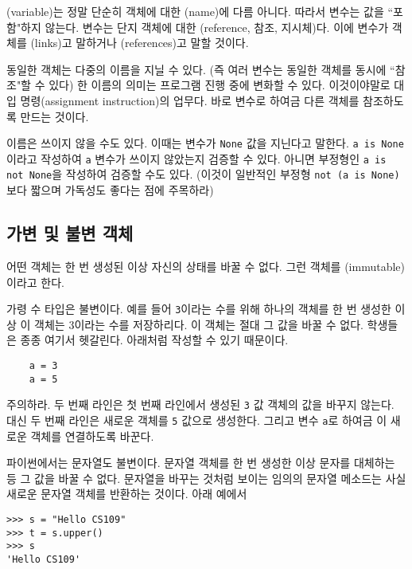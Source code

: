 \documentclass[a4paper]{oblivoir}
\begin{document}
(variable)는 정말 단순히 객체에 대한 (name)에 다름 아니다. 따라서 변수는 값을 ``포함"하지 않는다. 변수는 단지 객체에 대한 (reference, 참조, 지시체)다. 이에 변수가 객체를 (links)고 말하거나 (references)고 말할 것이다.  

동일한 객체는 다중의 이름을 지닐 수 있다. (즉 여러 변수는 동일한 객체를 동시에 ``참조"할 수 있다) 한 이름의 의미는 프로그램 진행 중에 변화할 수 있다. 이것이야말로 대입 명령(assignment instruction)의 업무다. 바로 변수로 하여금 다른 객체를 참조하도록 만드는 것이다. 

이름은 쓰이지 않을 수도 있다. 이때는 변수가 \texttt{None} 값을 지닌다고 말한다. \texttt{a is None}이라고 작성하여 \texttt{a} 변수가 쓰이지 않았는지 검증할 수 있다. 아니면 부정형인 \texttt{a is not None}을 작성하여 검증할 수도 있다. (이것이 일반적인 부정형 \texttt{not (a is None)}보다 짧으며 가독성도 좋다는 점에 주목하라) 

\subsection*{가변 및 불변 객체}

어떤 객체는 한 번 생성된 이상 자신의 상태를 바꿀 수 없다. 그런 객체를 (immutable)이라고 한다.

가령 수 타입은 불변이다. 예를 들어 \texttt{3}이라는 수를 위해 하나의 객체를 한 번 생성한 이상 이 객체는  $3$이라는 수를 저장하리다. 이 객체는 절대 그 값을 바꿀 수 없다. 학생들은 종종 여기서 헷갈린다. 아래처럼 작성할 수 있기 때문이다.

\begin{verbatim}
    a = 3
    a = 5
\end{verbatim}

 주의하라. 두 번째 라인은 첫 번째 라인에서 생성된 \texttt{3} 값 객체의 값을 바꾸지 않는다. 대신 두 번째 라인은 새로운 객체를 \texttt{5} 값으로 생성한다. 그리고 변수 \texttt{a}로 하여금 이 새로운 객체를 연결하도록 바꾼다. 

파이썬에서는 문자열도 불변이다. 문자열 객체를 한 번 생성한 이상 문자를 대체하는 등 그 값을 바꿀 수 없다. 문자열을 바꾸는 것처럼 보이는 임의의 문자열 메소드는 사실 새로운 문자열 객체를 반환하는 것이다. 아래 예에서

\begin{lstlisting}
>>> s = "Hello CS109"
>>> t = s.upper()
>>> s
'Hello CS109'
\end{lstlisting}
\end{document}
